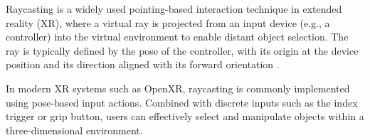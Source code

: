 Raycasting is a widely used pointing-based interaction technique in extended reality (XR), where a virtual ray is projected from an input device (e.g., a controller) into the virtual environment to enable distant object selection. The ray is typically defined by the pose of the controller, with its origin at the device position and its direction aligned with its forward orientation \parencite{mine_virtual_1995, bowman_evaluation_1997}. 

In modern XR systems such as OpenXR, raycasting is commonly implemented using pose-based input actions. Combined with discrete inputs such as the index trigger or grip button, users can effectively select and manipulate objects within a three-dimensional environment.